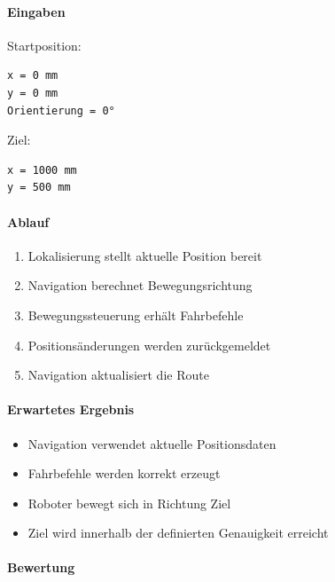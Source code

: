 \documentclass[
  a4paper,
  12pt,
  DIV=12,        %
  parskip=half,  %
  headings=small %
]{scrartcl}
\theoremstyle{definition}
\providecommand{\tightlist}{%
  \setlength{\itemsep}{0pt}\setlength{\parskip}{0pt}}
\theoremstyle{definition}
\begin{document}
\paragraph{Eingaben}\label{eingaben-10}

Startposition:

\begin{verbatim}
x = 0 mm
y = 0 mm
Orientierung = 0°
\end{verbatim}

Ziel:

\begin{verbatim}
x = 1000 mm
y = 500 mm
\end{verbatim}

\paragraph{Ablauf}\label{ablauf-10}

\begin{enumerate}
\def\labelenumi{\arabic{enumi}.}
\tightlist
\item
  Lokalisierung stellt aktuelle Position bereit
\item
  Navigation berechnet Bewegungsrichtung
\item
  Bewegungssteuerung erhält Fahrbefehle
\item
  Positionsänderungen werden zurückgemeldet
\item
  Navigation aktualisiert die Route
\end{enumerate}

\paragraph{Erwartetes Ergebnis}\label{erwartetes-ergebnis-10}

\begin{itemize}
\tightlist
\item
  Navigation verwendet aktuelle Positionsdaten
\item
  Fahrbefehle werden korrekt erzeugt
\item
  Roboter bewegt sich in Richtung Ziel
\item
  Ziel wird innerhalb der definierten Genauigkeit erreicht
\end{itemize}

\paragraph{Bewertung}\label{bewertung-10}
\end{document}

